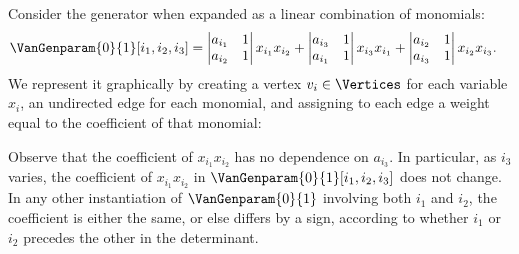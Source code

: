 Consider the generator when expanded as a linear combination of monomials:
\begin{align*}
  \VanGenparam{0}{1}[i_1, i_2, i_3]
  &=
  \begin{vmatrix}
    a_{i_1} & 1 \\
    a_{i_2} & 1
  \end{vmatrix}x_{i_1} x_{i_2}
  +
  \begin{vmatrix}
    a_{i_3} & 1 \\
    a_{i_1} & 1
  \end{vmatrix}x_{i_3} x_{i_1}
  +
  \begin{vmatrix}
    a_{i_2} & 1 \\
    a_{i_3} & 1
  \end{vmatrix}x_{i_2} x_{i_3}.
\end{align*}
We represent it graphically by creating a vertex $v_i \in \Vertices$ for each variable $x_i$, an
undirected edge for each monomial, and assigning to each edge a weight
equal to the coefficient of that monomial:
\begin{center}
\end{center}
Observe that the coefficient of \(x_{i_1}x_{i_2}\) has no dependence on
\(a_{i_3}\).
In particular, as \(i_3\) varies,
the coefficient of \(x_{i_1}x_{i_2}\) in \(\VanGenparam{0}{1}[i_1, i_2, i_3]\)
does not change.
In any other instantiation of \(\VanGenparam{0}{1}\) involving both
\(i_1\) and \(i_2\), the coefficient is either the same, or else differs by
a sign,
according to whether \(i_1\) or \(i_2\) precedes the other in the determinant.
